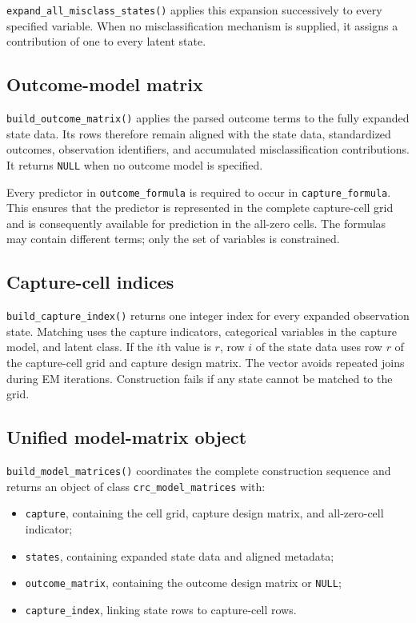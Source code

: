 \documentclass[11pt,letterpaper]{article}
\begin{document}
\texttt{expand\_all\_misclass\_states()} applies this expansion successively
to every specified variable. When no misclassification mechanism is supplied,
it assigns a contribution of one to every latent state.

\subsection{Outcome-model matrix}

\texttt{build\_outcome\_matrix()} applies the parsed outcome terms to the
fully expanded state data. Its rows therefore remain aligned with the state
data, standardized outcomes, observation identifiers, and accumulated
misclassification contributions. It returns \texttt{NULL} when no outcome
model is specified.

Every predictor in \texttt{outcome\_formula} is required to occur in
\texttt{capture\_formula}. This ensures that the predictor is represented in
the complete capture-cell grid and is consequently available for prediction
in the all-zero cells. The formulas may contain different terms; only the set
of variables is constrained.

\subsection{Capture-cell indices}

\texttt{build\_capture\_index()} returns one integer index for every expanded
observation state. Matching uses the capture indicators, categorical variables
in the capture model, and latent class. If the $i$th value is $r$, row $i$ of
the state data uses row $r$ of the capture-cell grid and capture design matrix.
The vector avoids repeated joins during EM iterations. Construction
fails if any state cannot be matched to the grid.

\subsection{Unified model-matrix object}

\texttt{build\_model\_matrices()} coordinates the complete construction
sequence and returns an object of class \texttt{crc\_model\_matrices} with:

\begin{itemize}
  \item \texttt{capture}, containing the cell grid, capture design matrix,
  and all-zero-cell indicator;
  \item \texttt{states}, containing expanded state data and aligned metadata;
  \item \texttt{outcome\_matrix}, containing the outcome design matrix or
  \texttt{NULL};
  \item \texttt{capture\_index}, linking state rows to capture-cell rows.
\end{itemize}
\end{document}
